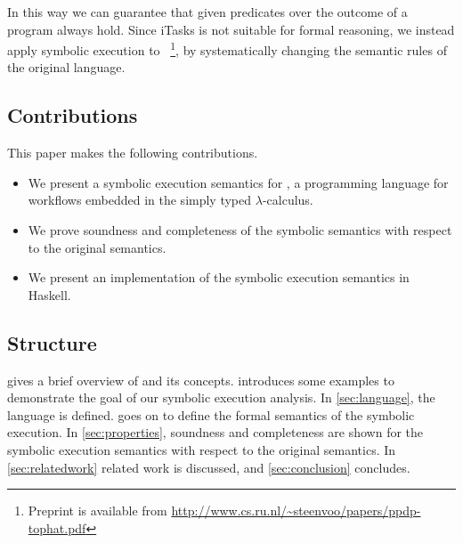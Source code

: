 In this way we can guarantee that given predicates over the outcome of a \TOP program always hold.
Since iTasks is not suitable for formal reasoning, we instead apply symbolic execution to \TOPHAT~\cite{Steenvoorden2019}\footnote{Preprint is available from \url{http://www.cs.ru.nl/~steenvoo/papers/ppdp-tophat.pdf}}, by systematically changing the semantic rules of the original language.



\subsection{Contributions}

This paper makes the following contributions.

\begin{itemize}
  \item We present a symbolic execution semantics for \TOPHAT, a programming language for workflows embedded in the simply typed $\lambda$-calculus.
  \item We prove soundness and completeness of the symbolic semantics with respect to the original \TOPHAT semantics.
  \item We present an implementation of the symbolic execution semantics in Haskell.
\end{itemize}



\subsection{Structure}

 gives a brief overview of \TOPHAT and its concepts.
 introduces some examples to demonstrate the goal of our symbolic execution analysis.
In \cref{sec:language}, the \TOPHAT language is defined.
 goes on to define the formal semantics of the symbolic execution.
In \cref{sec:properties}, soundness and completeness are shown for the symbolic execution semantics with respect to the original \TOPHAT semantics.
In \cref{sec:relatedwork} related work is discussed, and \cref{sec:conclusion} concludes.
